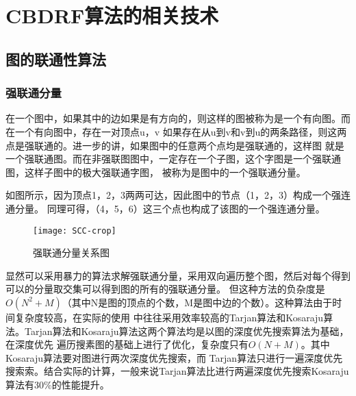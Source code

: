 \chapter{CBDRF算法的相关技术}
\label{chap:outline}
\section{图的联通性算法}
\subsection{强联通分量}
在一个图中，如果其中的边如果是有方向的，则这样的图被称为是一个有向图。而在一个有向图中，存在一对顶点u，v
如果存在从u到v和v到u的两条路径，则这两点是强联通的。进一步的讲，如果图中的任意两个点均是强联通的，这样图
就是一个强联通图。而在非强联图图中，一定存在一个子图，这个字图是一个强联通图，这样子图中的极大强联通字图，
被称为是图中的一个强联通分量。

如图所示，因为顶点1，2，3两两可达，因此图中的节点（1，2，3）构成一个强连通分量。
同理可得，（4，5，6）这三个点也构成了该图的一个强连通分量。
\begin{figure}[htbp]
\centering\texttt{[image: SCC-crop]}
\caption{强联通分量关系图}\label{fig:SCC}
\end{figure}
显然可以采用暴力的算法求解强联通分量，采用双向遍历整个图，然后对每个得到可以的分量取交集可以得到图的所有的强联通分量。
但这种方法的负杂度是$O({N}^{2} + M)$（其中N是图的顶点的个数，M是图中边的个数）。这种算法由于时间复杂度较高，在实际的使用
中往往采用效率较高的Tarjan算法和Kosaraju算法。Tarjan算法和Kosaraju算法这两个算法均是以图的深度优先搜索算法为基础，在深度优先
遍历搜素图的基础上进行了优化，复杂度只有$O(N + M)$。其中Kosaraju算法要对图进行两次深度优先搜索，而
Tarjan算法只进行一遍深度优先搜索索。结合实际的计算，一般来说Tarjan算法比进行两遍深度优先搜索Kosaraju算法有30\%的性能提升。

